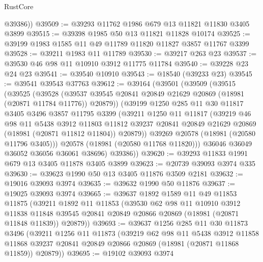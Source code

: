 \begin{lexlean}{RustCore}
\begin{coremodule}
        @39386))
@39509 := @39293 @11762 @1986 @679 @13 @11821 @11830 @3405 @3899
@39515 := @39398 @1985 @50 @13 @11821 @11828 @10174
@39525 := @39199 @1983 @1585 @11 @49 @11789 @11820 @11827 @3857 @11767 @3399
@39528 := @39211 @1983 @11 @11789
@39530 := @39217 @263 @23
@39537 := @39530 @46 @98 @11 @10910 @3912 @11775 @11784
@39540 := @39228 @23 @24 @23
@39541 := @39540 @10910
@39543 := @18540 (@39233 @23)
@39545 := @39541 @39543 @37763
@39612 := @39164
    (@39501
      (@39509
        (@39515
          (@39525
            (@39528
              (@39537 @39545 @20841 @20849 @21629 @20869 (@18981 (@20871 @11784 @11776)) @20879))
            (@39199
              @1250
              @285
              @11
              @30
              @11817
              @3405
              @3496
              @3857
              @11795
              @3399
              (@39211
                @1250
                @11
                @11817
                (@39219
                  @46
                  @98
                  @11
                  @5438
                  @3912
                  @11803
                  @11812
                  @39237
                  @20841
                  @20849
                  @21629
                  @20869
                  (@18981 (@20871 @11812 @11804))
                  @20879))
              @39269
              @20578
              (@18981 (@20580 @11796 @3405)))
            @20578
            (@18981 (@20580 @11768 @11820)))
          @36046
          @36049
          @36052
          @36056
          @36061
          @38696)
        @39386))
@39620 := @39293 @11833 @1991 @679 @13 @3405 @11878 @3405 @3899
@39623 := @20739 @39093 @3974 @335
@39630 := @39623 @1990 @50 @13 @3405 @11876 @3509 @2181
@39632 := @19016 @39093 @3974
@39635 := @39632 @1990 @50 @11876
@39637 := @19025 @39093 @3974
@39665 := @39637
    @1892
    @1589
    @11
    @49
    @11853
    @11875
    (@39211
      @1892
      @11
      @11853
      (@39530
        @62
        @98
        @11
        @10910
        @3912
        @11838
        @11848
        @39545
        @20841
        @20849
        @20866
        @20869
        (@18981 (@20871 @11848 @11839))
        @20879))
@39693 := @39637
    @1256
    @285
    @11
    @30
    @11873
    @3496
    (@39211
      @1256
      @11
      @11873
      (@39219
        @62
        @98
        @11
        @5438
        @3912
        @11858
        @11868
        @39237
        @20841
        @20849
        @20866
        @20869
        (@18981 (@20871 @11868 @11859))
        @20879))
@39695 := @19102 @39093 @3974

\end{coremodule}
\end{lexlean}

